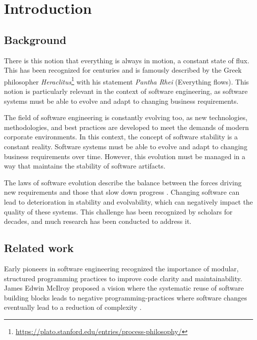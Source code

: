 \chapter{Introduction} \label{chap:introduction}

\section{Background} \label{sec:background}

There is this notion that everything is always in motion, a constant state of flux. This
has been recognized for centuries and is famously described by the Greek philosopher
\emph{Heraclitus}\footnote{\url{https://plato.stanford.edu/entries/process-philosophy/}}
with his statement \emph{Pantha Rhei} (Everything flows). This notion is particularly
relevant in the context of software engineering, as software systems must be able to
evolve and adapt to changing business requirements.

The field of software engineering is constantly evolving too, as new technologies,
methodologies, and best practices are developed to meet the demands of modern corporate
environments. In this context, the concept of software stability is a constant reality.
Software systems must be able to evolve and adapt to changing business requirements over
time. However, this evolution must be managed in a way that maintains the stability of
software artifacts.

The laws of software evolution describe the balance between the forces driving new
requirements and those that slow down progress \citeauthor*{lehman_programs_1980}.
Changing software can lead to deterioration in stability and evolvability, which can
negatively impact the quality of these systems. This challenge has been recognized by
scholars for decades, and much research has been conducted to address it.

\section{Related work} \label{sub:related_work}

Early pioneers in software engineering recognized the importance of modular, structured
programming practices to improve code clarity and maintainability. James Edwin McIlroy
proposed a vision where the systematic reuse of software building blocks leads to negative
programming-practices where software changes eventually lead to a reduction of complexity
\parencite{p_naur_nato_1968}. 

